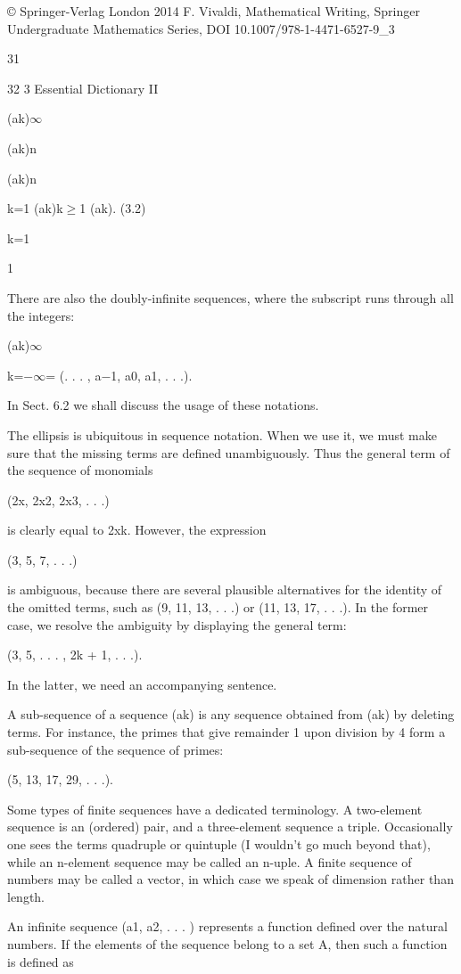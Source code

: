 \documentclass[11pt]{article}
\theoremstyle{plain}
\theoremstyle{definition}
\begin{document}
© Springer-Verlag London 2014 F. Vivaldi, Mathematical Writing, Springer Undergraduate Mathematics Series, DOI 10.1007/978-1-4471-6527-9\_3

31

32 3 Essential Dictionary II

(ak)$\infty$

(ak)n

(ak)n

k=1 (ak)k$\geq$1 (ak). (3.2)

k=1

1

There are also the doubly-infinite sequences, where the subscript runs through all the integers:

(ak)$\infty$

k=$-$$\infty$= (. . . , a$-$1, a0, a1, . . .).

In Sect. 6.2 we shall discuss the usage of these notations.

The ellipsis is ubiquitous in sequence notation. When we use it, we must make sure that the missing terms are defined unambiguously. Thus the general term of the sequence of monomials

(2x, 2x2, 2x3, . . .)

is clearly equal to 2xk. However, the expression

(3, 5, 7, . . .)

is ambiguous, because there are several plausible alternatives for the identity of the omitted terms, such as (9, 11, 13, . . .) or (11, 13, 17, . . .). In the former case, we resolve the ambiguity by displaying the general term:

(3, 5, . . . , 2k + 1, . . .).

In the latter, we need an accompanying sentence.

A sub-sequence of a sequence (ak) is any sequence obtained from (ak) by deleting terms. For instance, the primes that give remainder 1 upon division by 4 form a sub-sequence of the sequence of primes:

(5, 13, 17, 29, . . .).

Some types of finite sequences have a dedicated terminology. A two-element sequence is an (ordered) pair, and a three-element sequence a triple. Occasionally one sees the terms quadruple or quintuple (I wouldn't go much beyond that), while an n-element sequence may be called an n-uple. A finite sequence of numbers may be called a vector, in which case we speak of dimension rather than length.

An infinite sequence (a1, a2, . . . ) represents a function defined over the natural numbers. If the elements of the sequence belong to a set A, then such a function is defined as
\end{document}
